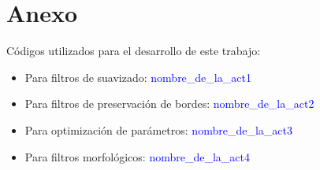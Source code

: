 \section{Anexo}

    Códigos utilizados para el desarrollo de este trabajo:

    \begin{itemize}
        \item Para filtros de suavizado:
            {\textcolor{blue}{nombre\_de\_la\_act1}}

        \item Para filtros de preservación de bordes:
            {\textcolor{blue}{nombre\_de\_la\_act2}}

        \item Para optimización de parámetros:
            {\textcolor{blue}{nombre\_de\_la\_act3}}

        \item Para filtros morfológicos:
            {\textcolor{blue}{nombre\_de\_la\_act4}}
        
    \end{itemize}